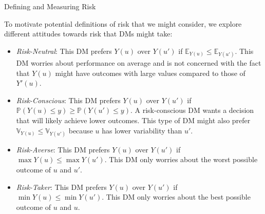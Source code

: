 \documentclass[9pt]{beamer}
\begin{document}
%
\begin{frame}{Defining and Measuring Risk}

To motivate potential definitions of risk that we might consider, we explore different attitudes towards risk that DMs might take: 

\begin{block}{}
\begin{itemize}
\item {\em Risk-Neutral}: This DM prefers $Y(u)$ over $Y(u')$ if $\mathbb{E}_{Y(u)}\leq \mathbb{E}_{Y(u')}$.  This DM worries about performance on average and is not concerned with the fact that $Y(u)$ might have outcomes with large values compared to those of $Y'(u)$. 

\item {\em Risk-Conscious}: This DM prefers $Y(u)$ over $Y(u')$ if $\mathbb{P}(Y(u)\leq y)\geq \mathbb{P}(Y(u')\leq y)$.  A risk-conscious DM wants a decision that will likely achieve lower outcomes. This type of DM might also prefer $\mathbb{V}_{Y(u)}\leq \mathbb{V}_{Y(u')}$ because $u$ has lower variability than $u'$.

\item {\em Risk-Averse}: This DM prefers $Y(u)$ over $Y(u')$ if $\max  Y(u)\leq \max Y(u')$.  This DM only worries about the worst possible outcome of $u$ and $u'$.

\item {\em Risk-Taker}: This DM prefers $Y(u)$ over $Y(u')$ if $\min Y(u)\leq \min Y(u')$.  This DM only worries about the best possible outcome of $u$ and $u$.

\end{itemize}
\end{block}


\end{frame}
\end{document}
